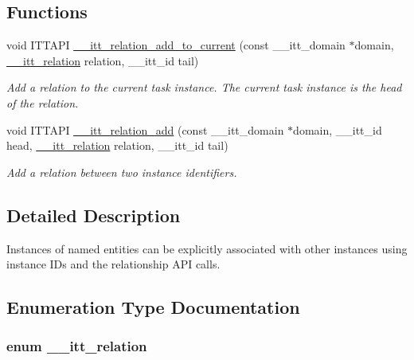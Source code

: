 \subsection*{Functions}
\begin{DoxyCompactItemize}
\item 
void I\+T\+T\+A\+P\+I \hyperlink{group__relations_ga74908fac2ada0681fe88bf47b30ecf86}{\+\_\+\+\_\+itt\+\_\+relation\+\_\+add\+\_\+to\+\_\+current} (const \+\_\+\+\_\+itt\+\_\+domain $\ast$domain, \hyperlink{group__relations_ga2f588e0d778ac0cca7cc0b64cfb1bdca}{\+\_\+\+\_\+itt\+\_\+relation} relation, \+\_\+\+\_\+itt\+\_\+id tail)
\begin{DoxyCompactList}\small\item\em Add a relation to the current task instance. The current task instance is the head of the relation. \end{DoxyCompactList}\item 
void I\+T\+T\+A\+P\+I \hyperlink{group__relations_gaa92212e121a2b80f71af099fc492b136}{\+\_\+\+\_\+itt\+\_\+relation\+\_\+add} (const \+\_\+\+\_\+itt\+\_\+domain $\ast$domain, \+\_\+\+\_\+itt\+\_\+id head, \hyperlink{group__relations_ga2f588e0d778ac0cca7cc0b64cfb1bdca}{\+\_\+\+\_\+itt\+\_\+relation} relation, \+\_\+\+\_\+itt\+\_\+id tail)
\begin{DoxyCompactList}\small\item\em Add a relation between two instance identifiers. \end{DoxyCompactList}\end{DoxyCompactItemize}


\subsection{Detailed Description}
Instances of named entities can be explicitly associated with other instances using instance I\+Ds and the relationship A\+P\+I calls. 

\subsection{Enumeration Type Documentation}
\hypertarget{group__relations_ga2f588e0d778ac0cca7cc0b64cfb1bdca}{}
\subsubsection[{\+\_\+\+\_\+itt\+\_\+relation}]{\setlength{\rightskip}{0pt plus 5cm}enum {\bf \+\_\+\+\_\+itt\+\_\+relation}}\label{group__relations_ga2f588e0d778ac0cca7cc0b64cfb1bdca}


